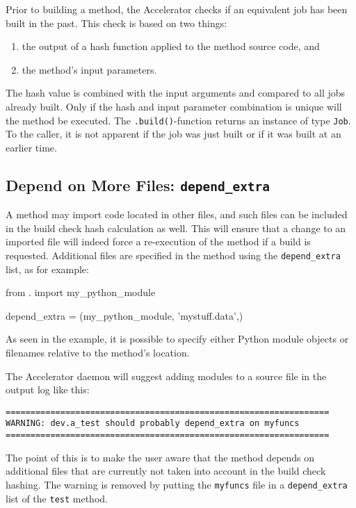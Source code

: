 Prior to building a method, the Accelerator checks if an equivalent
job has been built in the past.  This check is based on two things:
\begin{enumerate}
\item  the output of a hash function applied to the method source code, and
\item  the method's input parameters.
\end{enumerate}
The hash value is combined with the input arguments and compared to
all jobs already built.  Only if the hash and input parameter
combination is unique will the method be executed.  The
\texttt{.build()}-function returns an instance of type \texttt{Job}.
To the caller, it is not apparent if the job was just built or if it
was built at an earlier time.


\subsection{Depend on More Files:  \texttt{depend\_extra}}
A method may import code located in other files, and such files can be
included in the build check hash calculation as well.  This will
ensure that a change to an imported file will indeed force a
re-execution of the method if a build is requested.  Additional files
are specified in the method using the \texttt{depend\_extra} list, as
for example:
\begin{python}
from . import my_python_module

depend_extra = (my_python_module, 'mystuff.data',)
\end{python}
As seen in the example, it is possible to specify either Python module
objects or filenames relative to the method's location.

The Accelerator daemon will suggest adding modules to a source file in
the output log like this:
\begin{snugshade}
\begin{verbatim}
=================================================================
WARNING: dev.a_test should probably depend_extra on myfuncs
=================================================================
\end{verbatim}
\end{snugshade}
\noindent The point of this is to make the user aware that the method
depends on additional files that are currently not taken into account
in the build check hashing.  The warning is removed by putting the
\texttt{myfuncs} file in a \texttt{depend\_extra} list of the
\texttt{test} method.


